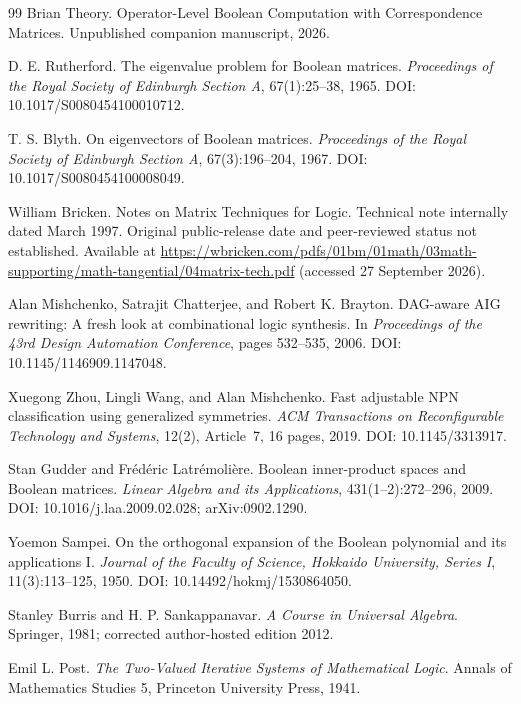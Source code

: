 \documentclass[11pt]{article}
\theoremstyle{definition}
\theoremstyle{remark}
\begin{document}
\begin{thebibliography}{99}
Brian Theory.
\newblock Operator-Level Boolean Computation with Correspondence Matrices.
\newblock Unpublished companion manuscript, 2026.

D. E. Rutherford.
\newblock The eigenvalue problem for Boolean matrices.
\newblock \emph{Proceedings of the Royal Society of Edinburgh Section A}, 67(1):25--38, 1965.
\newblock DOI: 10.1017/S0080454100010712.

T. S. Blyth.
\newblock On eigenvectors of Boolean matrices.
\newblock \emph{Proceedings of the Royal Society of Edinburgh Section A}, 67(3):196--204, 1967.
\newblock DOI: 10.1017/S0080454100008049.

William Bricken.
\newblock Notes on Matrix Techniques for Logic.
\newblock Technical note internally dated March 1997.  Original public-release date and peer-reviewed status not established. Available at \url{https://wbricken.com/pdfs/01bm/01math/03math-supporting/math-tangential/04matrix-tech.pdf} (accessed 27 September 2026).

Alan Mishchenko, Satrajit Chatterjee, and Robert K. Brayton.
\newblock DAG-aware AIG rewriting: A fresh look at combinational logic synthesis.
\newblock In \emph{Proceedings of the 43rd Design Automation Conference}, pages 532--535, 2006.
\newblock DOI: 10.1145/1146909.1147048.

Xuegong Zhou, Lingli Wang, and Alan Mishchenko.
\newblock Fast adjustable NPN classification using generalized symmetries.
\newblock \emph{ACM Transactions on Reconfigurable Technology and Systems}, 12(2), Article~7, 16 pages, 2019.
\newblock DOI: 10.1145/3313917.

Stan Gudder and Fr\'ed\'eric Latr\'emoli\`ere.
\newblock Boolean inner-product spaces and Boolean matrices.
\newblock \emph{Linear Algebra and its Applications}, 431(1--2):272--296, 2009.
\newblock DOI: 10.1016/j.laa.2009.02.028; arXiv:0902.1290.

Yoemon Sampei.
\newblock On the orthogonal expansion of the Boolean polynomial and its applications I.
\newblock \emph{Journal of the Faculty of Science, Hokkaido University, Series I}, 11(3):113--125, 1950.
\newblock DOI: 10.14492/hokmj/1530864050.

Stanley Burris and H. P. Sankappanavar.
\newblock \emph{A Course in Universal Algebra}.
\newblock Springer, 1981; corrected author-hosted edition 2012.

Emil L. Post.
\newblock \emph{The Two-Valued Iterative Systems of Mathematical Logic}.
\newblock Annals of Mathematics Studies 5, Princeton University Press, 1941.

\end{thebibliography}
\end{document}
